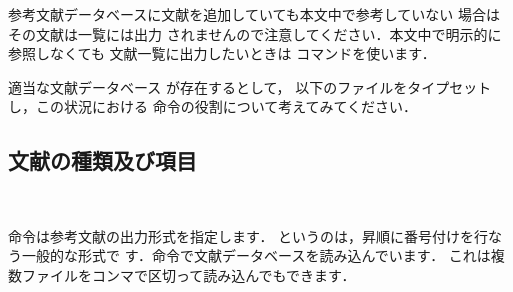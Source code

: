 \begin{Prob}
参考文献データベースに文献を追加していても本文中で参考していない
場合はその文献は一覧には出力
されませんので注意してください．本文中で明示的に参照しなくても
文献一覧に出力したいときは コマンドを使います．
\begin{Syntax}
\end{Syntax}

適当な文献データベース が存在するとして，
以下のファイルをタイプセットし，この状況における 
命令の役割について考えてみてください．


\end{Prob}



\subsection{文献の種類及び項目}
%
\begin{Syntax}
\\
\end{Syntax}
命令は参考文献の出力形式を指定します．
というのは，昇順に番号付けを行なう一般的な形式で
す．命令で文献データベースを読み込んでいます．
これは複数ファイルをコンマで区切って読み込んでもできます．


